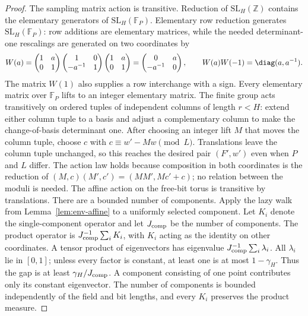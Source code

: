 \begin{proof}
The sampling matrix action is transitive. Reduction of $\mathrm{SL}_H(\mathbb Z)$
contains the elementary generators of $\mathrm{SL}_H(\mathbb F_P)$.
Elementary row reduction generates $\mathrm{SL}_H(\mathbb F_P)$:
row additions are elementary matrices, while the needed determinant-one
rescalings are generated on two coordinates by
\[
 W(a)=
 \begin{pmatrix}1&a\\0&1\end{pmatrix}
 \begin{pmatrix}1&0\\-a^{-1}&1\end{pmatrix}
 \begin{pmatrix}1&a\\0&1\end{pmatrix}
 =\begin{pmatrix}0&a\\-a^{-1}&0\end{pmatrix},
 \qquad W(a)W(-1)=\diag(a,a^{-1}).
\]
The matrix $W(1)$ also supplies a row interchange with a sign.
Every elementary matrix over $\mathbb F_P$ lifts to an integer
elementary matrix. The finite group acts transitively on ordered tuples of independent
columns of length $r<H$: extend either column tuple to a basis and adjust
a complementary column to make the change-of-basis determinant one.
After choosing an integer lift $M$ that moves the column tuple, choose
$c$ with $c\equiv w'-Mw\pmod L$. Translations leave the column tuple
unchanged, so this reaches the desired pair $(F',w')$ even when
$P$ and $L$ differ. The action law holds because composition in
both coordinates is the reduction of
$(M,c)(M',c')=(MM',Mc'+c)$; no relation between the moduli is needed.
The affine action on the free-bit torus is transitive by translations.
There are a bounded number of components. Apply the lazy walk from
Lemma~\ref{lem:env-affine} to a uniformly selected component.
Let $K_i$ denote the single-component operator and let
$J_{\rm comp}$ be the number of components. The product operator is
$J_{\rm comp}^{-1}\sum_i K_i$, with $K_i$ acting as the identity
on other coordinates. A tensor product of eigenvectors has eigenvalue
$J_{\rm comp}^{-1}\sum_i\lambda_i$. All $\lambda_i$ lie in $[0,1]$;
unless every factor is constant, at least one is at most
$1-\gamma_H$. Thus the gap is at least
$\gamma_H/J_{\rm comp}$. A component consisting of one point
contributes only its constant eigenvector. The number of components
is bounded independently of the field and bit lengths, and every
$K_i$ preserves the product measure.


\end{proof}
